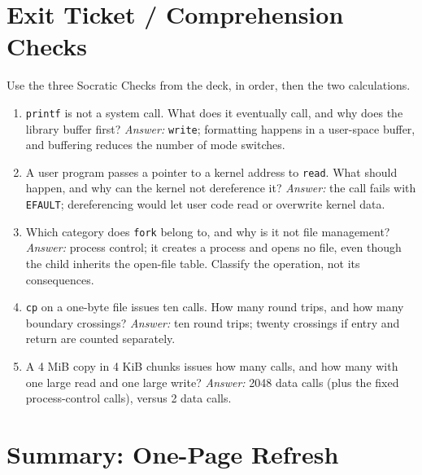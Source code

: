 \documentclass[11pt]{article}
\begin{document}
\section{Exit Ticket / Comprehension Checks}

Use the three Socratic Checks from the deck, in order, then the two calculations.

\begin{enumerate}
  \item \texttt{printf} is not a system call. What does it eventually call, and why does the library buffer first? \emph{Answer:} \texttt{write}; formatting happens in a user-space buffer, and buffering reduces the number of mode switches.
  \item A user program passes a pointer to a kernel address to \texttt{read}. What should happen, and why can the kernel not dereference it? \emph{Answer:} the call fails with \texttt{EFAULT}; dereferencing would let user code read or overwrite kernel data.
  \item Which category does \texttt{fork} belong to, and why is it not file management? \emph{Answer:} process control; it creates a process and opens no file, even though the child inherits the open-file table. Classify the operation, not its consequences.
  \item \texttt{cp} on a one-byte file issues ten calls. How many round trips, and how many boundary crossings? \emph{Answer:} ten round trips; twenty crossings if entry and return are counted separately.
  \item A 4 MiB copy in 4 KiB chunks issues how many calls, and how many with one large read and one large write? \emph{Answer:} 2048 data calls (plus the fixed process-control calls), versus 2 data calls.
\end{enumerate}

\section{Summary: One-Page Refresh}
\end{document}
